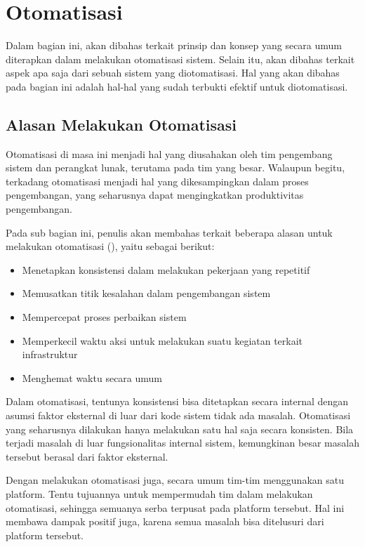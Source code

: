 \section{Otomatisasi}\label{automation}

Dalam bagian ini, akan dibahas terkait prinsip dan konsep yang secara umum diterapkan dalam melakukan otomatisasi sistem.
Selain itu, akan dibahas terkait aspek apa saja dari sebuah sistem yang diotomatisasi.
Hal yang akan dibahas pada bagian ini adalah hal-hal yang sudah terbukti efektif untuk diotomatisasi.

\subsection{Alasan Melakukan Otomatisasi}
Otomatisasi di masa ini menjadi hal yang diusahakan oleh tim pengembang sistem dan perangkat lunak, terutama pada tim yang besar.
Walaupun begitu, terkadang otomatisasi menjadi hal yang dikesampingkan dalam proses pengembangan, yang seharusnya dapat mengingkatkan produktivitas pengembangan.

Pada sub bagian ini, penulis akan membahas terkait beberapa alasan untuk melakukan otomatisasi (\cite{beyer2016site}), yaitu sebagai berikut:

\begin{itemize}
  \item Menetapkan konsistensi dalam melakukan pekerjaan yang repetitif
  \item Memusatkan titik kesalahan dalam pengembangan sistem
  \item Mempercepat proses perbaikan sistem
  \item Memperkecil waktu aksi untuk melakukan suatu kegiatan terkait infrastruktur
  \item Menghemat waktu secara umum
\end{itemize}

Dalam otomatisasi, tentunya konsistensi bisa ditetapkan secara internal dengan asumsi faktor eksternal di luar dari kode sistem tidak ada masalah.
Otomatisasi yang seharusnya dilakukan hanya melakukan satu hal saja secara konsisten.
Bila terjadi masalah di luar fungsionalitas internal sistem, kemungkinan besar masalah tersebut berasal dari faktor eksternal.

Dengan melakukan otomatisasi juga, secara umum tim-tim menggunakan satu platform.
Tentu tujuannya untuk mempermudah tim dalam melakukan otomatisasi, sehingga semuanya serba terpusat pada platform tersebut.
Hal ini membawa dampak positif juga, karena semua masalah bisa ditelusuri dari platform tersebut.

